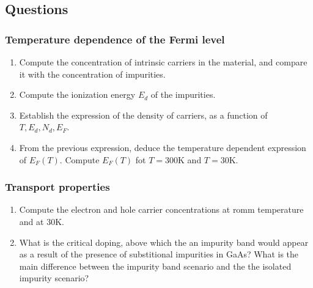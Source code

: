 \subsection*{Questions}

\subsubsection*{Temperature dependence of the Fermi level}

\begin{enumerate}[label=(\roman*)]
\item Compute the concentration of intrinsic carriers in the material,
  and compare it with the concentration of impurities.
\item Compute the ionization energy $E_d$ of the impurities.
\item Establish the expression of the density of carriers, as a
  function of $T, E_d, N_d, E_F$.
\item From the previous expression, deduce the temperature dependent
  expression of $E_F(T)$. Compute $E_F(T)$ fot $T=300$K and $T=30$K.
\end{enumerate}

\subsubsection*{Transport properties}

\begin{enumerate}[label=(\roman*)]
\item Compute the electron and hole carrier concentrations at romm
  temperature and at $30$K.
\item What is the critical doping, above which the an impurity band
  would appear as a result of the presence of substitional
  impurities in GaAs? What is the main difference between the impurity
  band scenario and the the isolated impurity scenario?
\end{enumerate}





